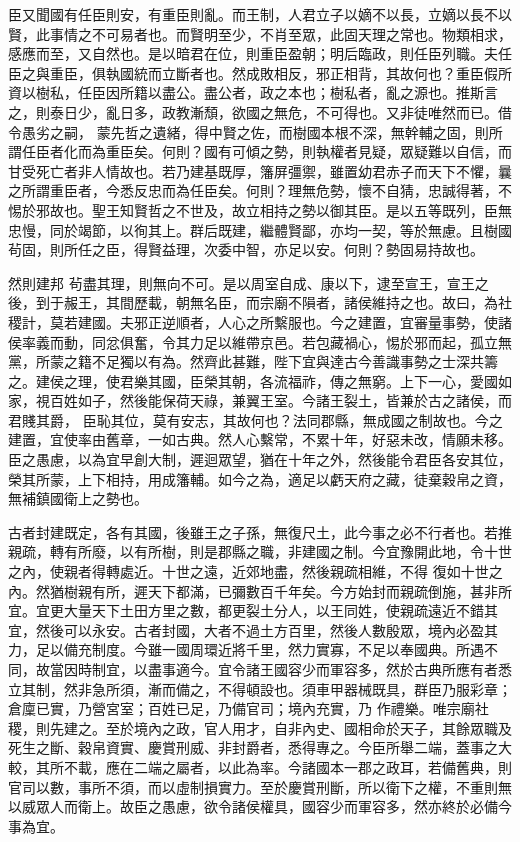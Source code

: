 \begin{pinyinscope}
 臣又聞國有任臣則安，有重臣則亂。而王制，人君立子以嫡不以長，立嫡以長不以賢，此事情之不可易者也。而賢明至少，不肖至眾，此固天理之常也。物類相求，感應而至，又自然也。是以暗君在位，則重臣盈朝；明后臨政，則任臣列職。夫任臣之與重臣，俱執國統而立斷者也。然成敗相反，邪正相背，其故何也？重臣假所資以樹私，任臣因所籍以盡公。盡公者，政之本也；樹私者，亂之源也。推斯言之，則泰日少，亂日多，政教漸頹，欲國之無危，不可得也。又非徒唯然而已。借令愚劣之嗣，
 蒙先哲之遺緒，得中賢之佐，而樹國本根不深，無幹輔之固，則所謂任臣者化而為重臣矣。何則？國有可傾之勢，則執權者見疑，眾疑難以自信，而甘受死亡者非人情故也。若乃建基既厚，籓屏彊禦，雖置幼君赤子而天下不懼，曩之所謂重臣者，今悉反忠而為任臣矣。何則？理無危勢，懷不自猜，忠誠得著，不惕於邪故也。聖王知賢哲之不世及，故立相持之勢以御其臣。是以五等既列，臣無忠慢，同於竭節，以徇其上。群后既建，繼體賢鄙，亦均一契，等於無慮。且樹國茍固，則所任之臣，得賢益理，次委中智，亦足以安。何則？勢固易持故也。



 然則建邦
 茍盡其理，則無向不可。是以周室自成、康以下，逮至宣王，宣王之後，到于赧王，其間歷載，朝無名臣，而宗廟不隕者，諸侯維持之也。故曰，為社稷計，莫若建國。夫邪正逆順者，人心之所繫服也。今之建置，宜審量事勢，使諸侯率義而動，同忿俱奮，令其力足以維帶京邑。若包藏禍心，惕於邪而起，孤立無黨，所蒙之籍不足獨以有為。然齊此甚難，陛下宜與達古今善識事勢之士深共籌之。建侯之理，使君樂其國，臣榮其朝，各流福祚，傳之無窮。上下一心，愛國如家，視百姓如子，然後能保荷天祿，兼翼王室。今諸王裂土，皆兼於古之諸侯，而君賤其爵，
 臣恥其位，莫有安志，其故何也？法同郡縣，無成國之制故也。今之建置，宜使率由舊章，一如古典。然人心繫常，不累十年，好惡未改，情願未移。臣之愚慮，以為宜早創大制，遲迴眾望，猶在十年之外，然後能令君臣各安其位，榮其所蒙，上下相持，用成籓輔。如今之為，適足以虧天府之藏，徒棄穀帛之資，無補鎮國衛上之勢也。



 古者封建既定，各有其國，後雖王之子孫，無復尺土，此今事之必不行者也。若推親疏，轉有所廢，以有所樹，則是郡縣之職，非建國之制。今宜豫開此地，令十世之內，使親者得轉處近。十世之遠，近郊地盡，然後親疏相維，不得
 復如十世之內。然猶樹親有所，遲天下都滿，已彌數百千年矣。今方始封而親疏倒施，甚非所宜。宜更大量天下土田方里之數，都更裂土分人，以王同姓，使親疏遠近不錯其宜，然後可以永安。古者封國，大者不過土方百里，然後人數殷眾，境內必盈其力，足以備充制度。今雖一國周環近將千里，然力實寡，不足以奉國典。所遇不同，故當因時制宜，以盡事適今。宜令諸王國容少而軍容多，然於古典所應有者悉立其制，然非急所須，漸而備之，不得頓設也。須車甲器械既具，群臣乃服彩章；倉廩已實，乃營宮室；百姓已足，乃備官司；境內充實，乃
 作禮樂。唯宗廟社稷，則先建之。至於境內之政，官人用才，自非內史、國相命於天子，其餘眾職及死生之斷、穀帛資實、慶賞刑威、非封爵者，悉得專之。今臣所舉二端，蓋事之大較，其所不載，應在二端之屬者，以此為率。今諸國本一郡之政耳，若備舊典，則官司以數，事所不須，而以虛制損實力。至於慶賞刑斷，所以衛下之權，不重則無以威眾人而衛上。故臣之愚慮，欲令諸侯權具，國容少而軍容多，然亦終於必備今事為宜。




\end{pinyinscope}
